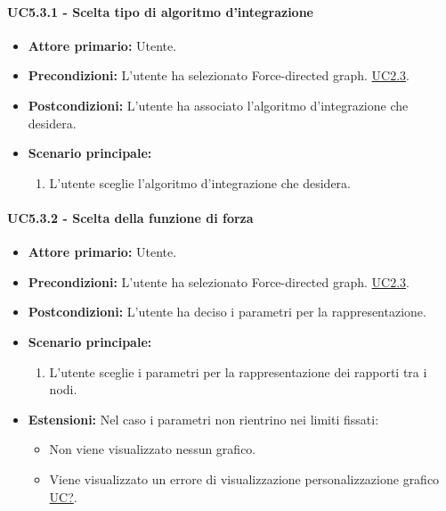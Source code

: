 \paragraph{UC5.3.1 - Scelta tipo di algoritmo d'integrazione}
\label{sec:UC5.3.1}
    \begin{itemize}
        \item \textbf{Attore primario:} Utente.
        \item \textbf{Precondizioni:} L'utente ha selezionato Force-directed graph. \hyperref[sec:UC2.3]{UC2.3}.
	    \item \textbf{Postcondizioni:} L'utente ha associato l'algoritmo d'integrazione che desidera.
	    \item \textbf{Scenario principale:}
	    \begin{enumerate}
	    		\item L'utente sceglie l'algoritmo d'integrazione che desidera.
		\end{enumerate}
    \end{itemize}
\paragraph{UC5.3.2 - Scelta della funzione di forza}
\label{sec:UC5.3.2}
    \begin{itemize}
        \item \textbf{Attore primario:} Utente.
        \item \textbf{Precondizioni:} L'utente ha selezionato Force-directed graph. \hyperref[sec:UC2.3]{UC2.3}.
	    \item \textbf{Postcondizioni:} L'utente ha deciso i parametri per la rappresentazione.
	    \item \textbf{Scenario principale:} 
	    \begin{enumerate}
	    		\item L'utente sceglie i parametri per la rappresentazione dei rapporti tra i nodi.
		\end{enumerate}
	    \item \textbf{Estensioni:} Nel caso i parametri non rientrino nei limiti fissati:
              \begin{itemize}
                  \item Non viene visualizzato nessun grafico.
                  \item Viene visualizzato un errore di visualizzazione personalizzazione grafico \hyperref[sec:UC - Errore di personalizzazione]{UC?}.
              \end{itemize}
    \end{itemize}
